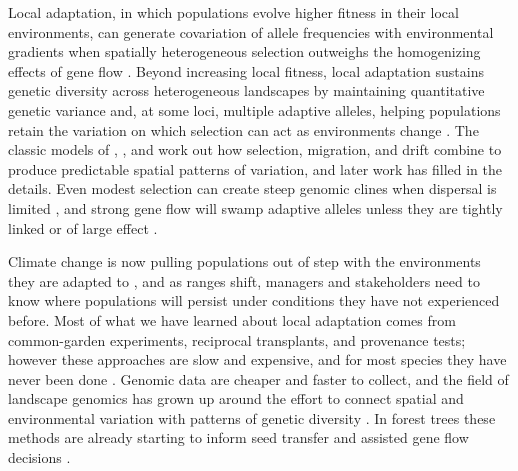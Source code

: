 \documentclass[]{article}
\providecommand{\revpoint}[2]{}%
\begin{document}
Local adaptation, in which populations evolve higher fitness in their local environments, 
can generate covariation of allele frequencies with environmental gradients 
when spatially heterogeneous selection outweighs the homogenizing effects of gene flow
\citep{savolainen_ecological_2013, lenormand_gene_2002}.
Beyond increasing local fitness,
local adaptation sustains genetic diversity across heterogeneous landscapes
by maintaining quantitative genetic variance and, at some loci, multiple adaptive alleles,
helping populations retain the variation
on which selection can act as environments change \citep{hedrick_genetic_2006, yeaman_regional_2006}\revpoint{1}{13}.
The classic models of 
\citet{wright_isolation_1943}, 
\citet{levene_genetic_1953},
and 
\citet{endler1977geographic}
work out how selection, migration, and drift
combine to produce predictable spatial patterns of variation,
and later work has filled in the details.
Even modest selection can create steep genomic clines
when dispersal is limited
\citep{tigano_genomics_2016, yeaman_genetic_2011},
and strong gene flow will swamp adaptive alleles
unless they are tightly linked or of large effect
\citep{slatkin_gene_1975}.

Climate change is now pulling populations out of step
with the environments they are adapted to \citep{lee_ipcc_2023},
and as ranges shift, managers and stakeholders need to know
where populations will persist under conditions
they have not experienced before.
Most of what we have learned about local adaptation comes from
common-garden experiments, reciprocal transplants,
and provenance tests; however these approaches are slow and expensive,
and for most species they have never been done
\citep{aitken_assisted_2013}.
Genomic data are cheaper and faster to collect,
and the field of landscape genomics has grown up around
the effort to connect spatial and environmental variation
with patterns of genetic diversity
\citep{manel_landscape_2003, rellstab_practical_2015}.
In forest trees these methods are already starting to inform
seed transfer and assisted gene flow decisions
\citep{aitken_bemmels_2016}.
\end{document}
